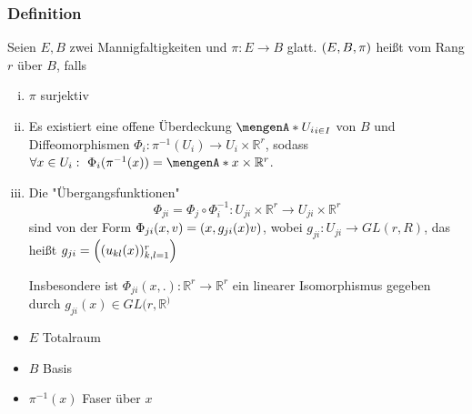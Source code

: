\subsubsection[Definition: Vektorbündel]{Definition}
\label{ssub:136}
Seien $E,B$ zwei Mannigfaltigkeiten und $\pi: E\to B$ glatt. $\enbrace{E,B,\pi}$ heißt  vom Rang $r$ über $B$, falls
\begin{enumerate}[(i)]
\item $\pi$ surjektiv
\item Es existiert eine offene Überdeckung $\set{U_i}_{i\in I}$ von $B$ und Diffeomorphismen $\Phi_i: \pi^{-1}(U_i) \to U_i\times \mathds{R}^r$, sodass $\forall x\in U_i:\ \Phi_i(\pi^{-1}(x)) = \set{x}\times \mathds{R}^r$.
\item Die "Übergangsfunktionen"
\[
\Phi_{ji} = \Phi_j \circ \Phi_i^{-1}: U_{ji}\times \mathds{R}^r \to U_{ji}\times \mathds{R}^r
\]
sind von der Form $\Phi_{ji} (x,v) = \enbrace*{x,g_{ji}(x) v}$, wobei $g_{ji}: U_{ji} \to GL(r,R)$, das heißt $g_{ji} = \enbrace*{(u_{kl}(x))_{k,l=1}^r}$
\begin{figure}[H]
\end{figure}
Insbesondere ist $\Phi_{ji}(x,.):\mathds{R}^r \to \mathds{R}^r$ ein linearer Isomorphismus gegeben durch $g_{ji}(x)\in GL(r,\mathds{R}^)$	
\end{enumerate}
\begin{itemize}
\item $E$ Totalraum
\item $B$ Basis
\item $\pi^{-1}(x)$ Faser über $x$
\end{itemize}

